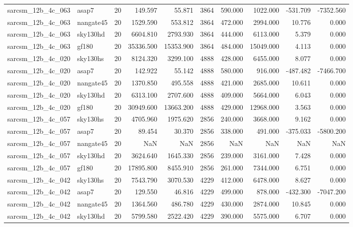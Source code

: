 \documentclass{article}
\begin{document}
\begin{longtable}{llrrrrrrrr}
sarcsm\_12b\_4c\_063 & asap7 & 20 & 149.597 & 55.871 & 3864 & 590.000 & 1022.000 & -531.709 & -7352.560 \\
sarcsm\_12b\_4c\_063 & nangate45 & 20 & 1529.590 & 553.812 & 3864 & 472.000 & 2994.000 & 10.776 & 0.000 \\
sarcsm\_12b\_4c\_063 & sky130hd & 20 & 6604.810 & 2793.930 & 3864 & 444.000 & 6113.000 & 5.379 & 0.000 \\
sarcsm\_12b\_4c\_063 & gf180 & 20 & 35336.500 & 15353.900 & 3864 & 484.000 & 15049.000 & 4.113 & 0.000 \\
sarcsm\_12b\_4c\_020 & sky130hs & 20 & 8124.320 & 3299.100 & 4888 & 428.000 & 6455.000 & 8.077 & 0.000 \\
sarcsm\_12b\_4c\_020 & asap7 & 20 & 142.922 & 55.142 & 4888 & 580.000 & 916.000 & -487.482 & -7466.700 \\
sarcsm\_12b\_4c\_020 & nangate45 & 20 & 1370.850 & 495.558 & 4888 & 421.000 & 2685.000 & 10.611 & 0.000 \\
sarcsm\_12b\_4c\_020 & sky130hd & 20 & 6313.100 & 2707.600 & 4888 & 409.000 & 5664.000 & 6.043 & 0.000 \\
sarcsm\_12b\_4c\_020 & gf180 & 20 & 30949.600 & 13663.200 & 4888 & 429.000 & 12968.000 & 3.563 & 0.000 \\
sarcsm\_12b\_4c\_057 & sky130hs & 20 & 4705.960 & 1975.620 & 2856 & 240.000 & 3668.000 & 9.162 & 0.000 \\
sarcsm\_12b\_4c\_057 & asap7 & 20 & 89.454 & 30.370 & 2856 & 338.000 & 491.000 & -375.033 & -5800.200 \\
sarcsm\_12b\_4c\_057 & nangate45 & 20 & NaN & NaN & 2856 & NaN & NaN & NaN & NaN \\
sarcsm\_12b\_4c\_057 & sky130hd & 20 & 3624.640 & 1645.330 & 2856 & 239.000 & 3161.000 & 7.428 & 0.000 \\
sarcsm\_12b\_4c\_057 & gf180 & 20 & 17895.800 & 8455.910 & 2856 & 261.000 & 7344.000 & 6.751 & 0.000 \\
sarcsm\_12b\_4c\_042 & sky130hs & 20 & 7543.790 & 3070.530 & 4229 & 412.000 & 6478.000 & 8.627 & 0.000 \\
sarcsm\_12b\_4c\_042 & asap7 & 20 & 129.550 & 46.816 & 4229 & 499.000 & 878.000 & -432.300 & -7047.200 \\
sarcsm\_12b\_4c\_042 & nangate45 & 20 & 1364.560 & 486.780 & 4229 & 430.000 & 2874.000 & 10.845 & 0.000 \\
sarcsm\_12b\_4c\_042 & sky130hd & 20 & 5799.580 & 2522.420 & 4229 & 390.000 & 5575.000 & 6.707 & 0.000 \\

\end{longtable}
\end{document}
